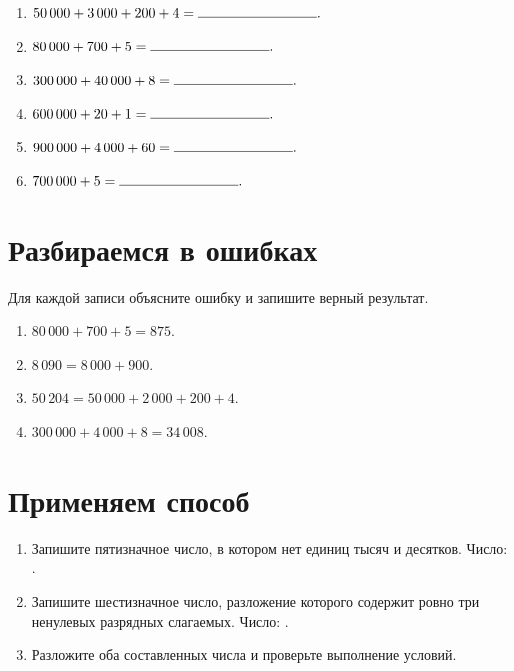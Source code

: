 \begin{practicebox}
  \begin{enumerate}[label=\textbf{\arabic*.}]
    \item \(50\,000+3\,000+200+4=\answerblank[30mm].\)
    \item \(80\,000+700+5=\answerblank[30mm].\)
    \item \(300\,000+40\,000+8=\answerblank[30mm].\)
    \item \(600\,000+20+1=\answerblank[30mm].\)
    \item \(900\,000+4\,000+60=\answerblank[30mm].\)
    \item \(700\,000+5=\answerblank[30mm].\)
  \end{enumerate}
\end{practicebox}

\section{Разбираемся в ошибках}

\begin{warningbox}
  Для каждой записи объясните ошибку и запишите верный результат.
  \begin{enumerate}[label=\textbf{\arabic*.}]
    \item \(80\,000+700+5=875.\)
    \item \(8\,090=8\,000+900.\)
    \item \(50\,204=50\,000+2\,000+200+4.\)
    \item \(300\,000+4\,000+8=34\,008.\)
  \end{enumerate}
\end{warningbox}

\section{Применяем способ}

\begin{practicebox}
  \begin{enumerate}[label=\textbf{\arabic*.}]
    \item Запишите пятизначное число, в котором нет единиц тысяч и десятков.
      Число: \answerblank[35mm].
    \item Запишите шестизначное число, разложение которого содержит ровно три
      ненулевых разрядных слагаемых. Число: \answerblank[35mm].
    \item Разложите оба составленных числа и проверьте выполнение условий.
  \end{enumerate}
\end{practicebox}

